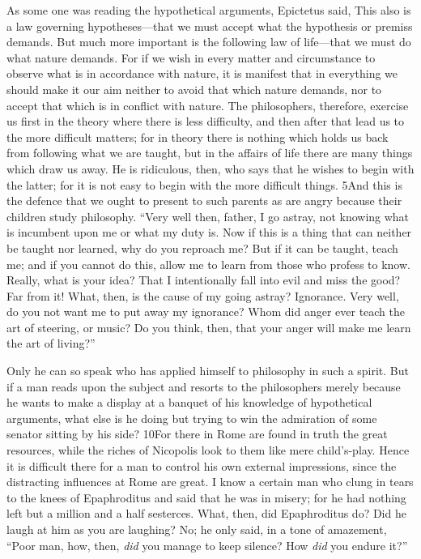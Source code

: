 As some one was reading the hypothetical arguments, Epictetus said, This also is a law governing hypotheses—that we must accept what the hypothesis or premiss demands. But much more important is the following law of life—that we must do what nature demands. For if we wish in every matter and circumstance to observe what is in accordance with nature, it is manifest that in everything we should make it our aim neither to avoid that which nature demands, nor to accept that which is in conflict with nature. The philosophers, therefore, exercise us first in the theory where there is less difficulty, and then after that lead us to the more difficult matters; for in theory there is nothing which holds us back from following what we are taught, but in the affairs of life there are many things which draw us away. He is ridiculous, then, who says that he wishes to begin with the latter; for it is not easy to begin with the more difficult things. 5And this is the defence that we ought to present to such parents as are angry because their children study philosophy. ``Very well then, father, I go astray, not knowing what is incumbent upon me or what my duty is. Now if this is a thing that can neither be taught nor learned, why do you reproach me? But if it can be taught, teach me; and if you cannot do this, allow me to learn from those who profess to know. Really, what is your idea? That I intentionally fall into evil and miss the good? Far from it! What, then, is the cause of my going astray? Ignorance. Very well, do you not want me to put away my ignorance? Whom did anger ever teach the art of steering, or music? Do you think, then, that your anger will make me learn the art of living?''

Only he can so speak who has applied himself to philosophy in such a spirit. But if a man reads upon the subject and resorts to the philosophers merely because he wants to make a display at a banquet of his knowledge of hypothetical arguments, what else is he doing but trying to win the admiration of some senator sitting by his side? 10For there in Rome are found in truth the great resources, while the riches of Nicopolis look to them like mere child's-play. Hence it is difficult there for a man to control his own external impressions, since the distracting influences at Rome are great. I know a certain man who clung in tears to the knees of Epaphroditus and said that he was in misery; for he had nothing left but a million and a half sesterces. What, then, did Epaphroditus do? Did he laugh at him as you are laughing? No; he only said, in a tone of amazement, ``Poor man, how, then, \emph{did} you manage to keep silence? How \emph{did} you endure it?''

